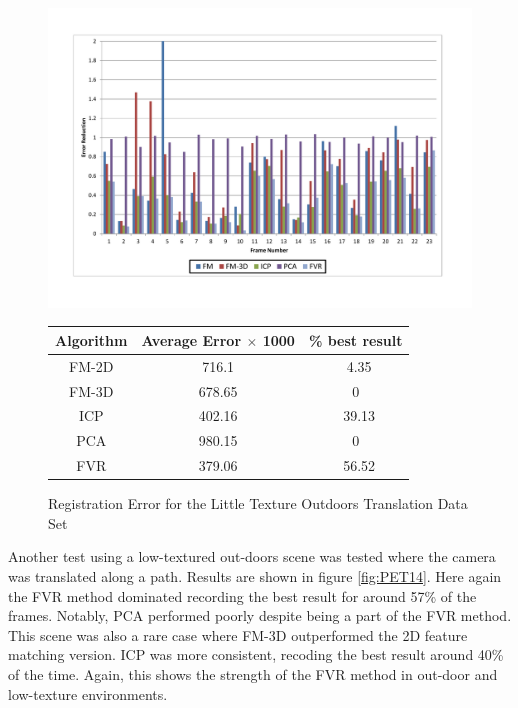 \begin{figure}
\centering
\includegraphics[width=6in]{images/results/Outside_No_Texture_Translation}
\caption{Registration Error for the Little Texture Outdoors Translation Data Set}
\label{fig:PET14}

\begin{tabular}{ccc}
\hline
\textbf{Algorithm} & \textbf{Average Error $\times$ 1000} & \textbf{\% best result}\\ \hline
FM-2D	& 716.1 & ~4.35\\
FM-3D	& 678.65 & 0\\
ICP		& 402.16 & ~39.13\\
PCA		& 980.15 & 0\\
FVR		& 379.06 & ~56.52\\
\end{tabular}
\label{tab:PET14ST}
\end{figure} 

Another test using a low-textured out-doors scene was tested where the camera was translated along a path. Results are shown in figure \ref{fig:PET14}. Here again the FVR method dominated recording the best result for around 57\% of the frames. Notably, PCA performed poorly despite being a part of the FVR method. This scene was also a rare case where FM-3D outperformed the 2D feature matching version. ICP was more consistent, recoding the best result around 40\% of the time. Again, this shows the strength of the FVR method in out-door and low-texture environments. 


